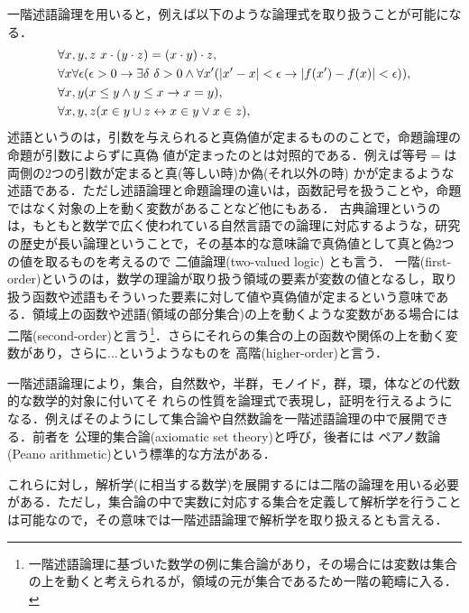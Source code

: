 \documentclass{ltjsarticle}
\theoremstyle{mystyle1}
\theoremstyle{mystyle2}
\newcommand{\red}[1]{{\color{red} #1}}
\begin{document}
一階述語論理を用いると，例えば以下のような論理式を取り扱うことが可能になる．
\begin{align}
   & \forall x,y,z\ x\cdot\qty(y\cdot z) = (x\cdot y)\cdot z,                                                                                                           \\
   & \forall x\forall\epsilon\qty(\epsilon>0\to\exists\delta\ \delta>0\wedge\forall x^\prime\qty(\qty|x^\prime-x|<\epsilon\to\qty|f\qty(x^\prime)-f\qty(x)|<\epsilon)), \\
   & \forall x,y\qty(x\leq y\wedge y\leq x\to x=y),                                                                                                                     \\
   & \forall x,y,z\qty(x\in y\cup z\leftrightarrow x\in y\vee x\in z),
\end{align}
\red{述語}というのは，引数を与えられると真偽値が定まるもののことで，命題論理の命題が引数によらずに真偽 値が定まったのとは対照的である．例えば等号$=$は両側の2つの引数が定まると真(等しい時)か偽(それ以外の時) かが定まるような述語である．ただし述語論理と命題論理の違いは，函数記号を扱うことや，命題ではなく対象の上を動く変数があることなど他にもある．\red{古典}論理というのは，もともと数学で広く使われている自然言語での論理に対応するような，研究の歴史が長い論理ということで，その基本的な意味論で真偽値として真と偽2つの値を取るものを考えるので\red{二値論理}(two-valued logic) とも言う．\red{一階}(first-order)というのは，数学の理論が取り扱う領域の要素が変数の値となるし，取り扱う函数や述語もそういった要素に対して値や真偽値が定まるという意味である．領域上の函数や述語(領域の部分集合)の上を動くような変数がある場合には\red{二階}(second-order)と言う\footnote{一階述語論理に基づいた数学の例に集合論があり，その場合には変数は集合の上を動くと考えられるが，領域の元が集合であるため一階の範疇に入る．}．さらにそれらの集合の上の函数や関係の上を動く変数があり，さらに...というようなものを\red{高階}(higher-order)と言う．

一階述語論理により，集合，自然数や，半群，モノイド，群，環，体などの代数的な数学的対象に付いてそ れらの性質を論理式で表現し，証明を行えるようになる．例えばそのようにして集合論や自然数論を一階述語論理の中で展開できる．前者を\red{公理的集合論}(axiomatic set theory)と呼び，後者には\red{ペアノ数論}(Peano arithmetic)という標準的な方法がある．

これらに対し，解析学(に相当する数学)を展開するには二階の論理を用いる必要がある．ただし，集合論の中で実数に対応する集合を定義して解析学を行うことは可能なので，その意味では一階述語論理で解析学を取り扱えるとも言える．
\end{document}
